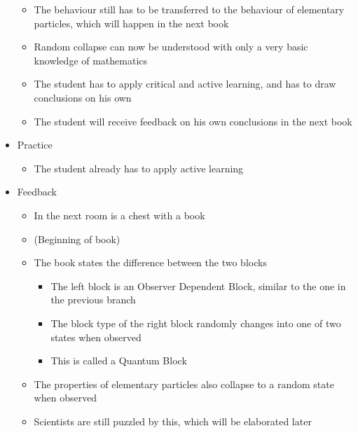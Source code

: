 \documentclass[11pt,twoside]{report} %
\begin{document}
\begin{itemize}
\begin{itemize}
			\item The behaviour still has to be transferred to the behaviour of elementary particles, which will happen in the next book
			\item Random collapse can now be understood with only a very basic knowledge of mathematics
			\item The student has to apply critical and active learning, and has to draw conclusions on his own
			\item The student will receive feedback on his own conclusions in the next book
		\end{itemize}
		\item Practice
		\begin{itemize}
			\item The student already has to apply active learning
		\end{itemize}
		\item Feedback
		\begin{itemize}
			\item In the next room is a chest with a book
			\item (Beginning of book)
			\item The book states the difference between the two blocks
			\begin{itemize}
				\item The left block is an Observer Dependent Block, similar to the one in the previous branch
				\item The block type of the right block randomly changes into one of two states when observed
				\item This is called a Quantum Block
			\end{itemize}
			\item The properties of elementary particles also collapse to a random state when observed
			\item Scientists are still puzzled by this, which will be elaborated later
		\end{itemize}
	\end{itemize}
\end{document}
